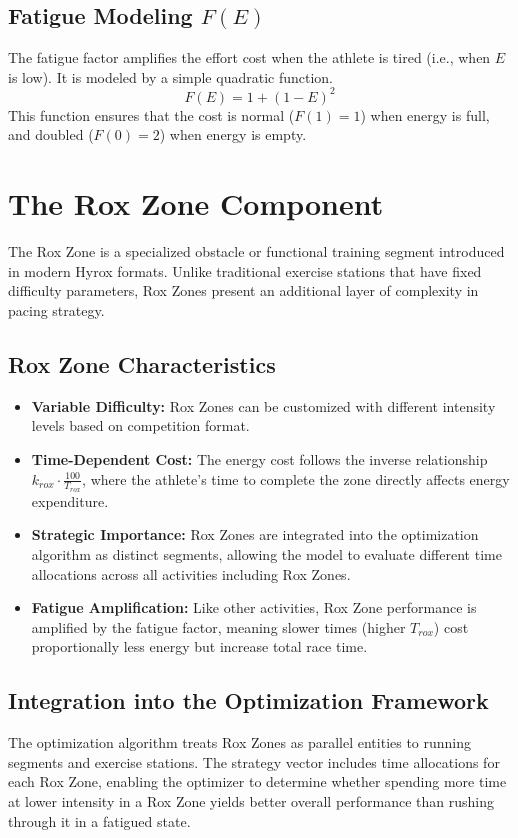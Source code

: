 \documentclass[11pt, a4paper]{article}
\begin{document}
	\subsection{Fatigue Modeling $F(E)$}
	The fatigue factor amplifies the effort cost when the athlete is tired (i.e., when $E$ is low). It is modeled by a simple quadratic function.
	\begin{equation}
		F(E) = 1 + (1 - E)^2
	\end{equation}
	This function ensures that the cost is normal ($F(1)=1$) when energy is full, and doubled ($F(0)=2$) when energy is empty.
	
	\section{The Rox Zone Component}
	The Rox Zone is a specialized obstacle or functional training segment introduced in modern Hyrox formats. Unlike traditional exercise stations that have fixed difficulty parameters, Rox Zones present an additional layer of complexity in pacing strategy.
	
	\subsection{Rox Zone Characteristics}
	\begin{itemize}
		\item \textbf{Variable Difficulty:} Rox Zones can be customized with different intensity levels based on competition format.
		\item \textbf{Time-Dependent Cost:} The energy cost follows the inverse relationship $k_{rox} \cdot \frac{100}{T_{rox}}$, where the athlete's time to complete the zone directly affects energy expenditure.
		\item \textbf{Strategic Importance:} Rox Zones are integrated into the optimization algorithm as distinct segments, allowing the model to evaluate different time allocations across all activities including Rox Zones.
		\item \textbf{Fatigue Amplification:} Like other activities, Rox Zone performance is amplified by the fatigue factor, meaning slower times (higher $T_{rox}$) cost proportionally less energy but increase total race time.
	\end{itemize}
	
	\subsection{Integration into the Optimization Framework}
	The optimization algorithm treats Rox Zones as parallel entities to running segments and exercise stations. The strategy vector includes time allocations for each Rox Zone, enabling the optimizer to determine whether spending more time at lower intensity in a Rox Zone yields better overall performance than rushing through it in a fatigued state.
	
\end{document}
